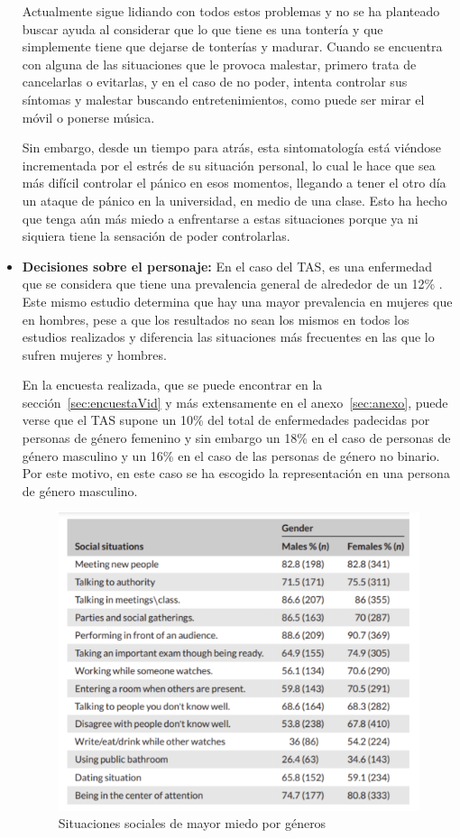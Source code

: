 \documentclass[12pt, a4paper,twoside,titlepage]{book}
\begin{document}
\begin{itemize}
{    Actualmente sigue lidiando con todos estos problemas y no se ha planteado buscar ayuda al considerar que lo que tiene es una tontería y que simplemente tiene que dejarse de tonterías y madurar. Cuando se encuentra con alguna de las situaciones que le provoca malestar, primero trata de cancelarlas o evitarlas, y en el caso de no poder, intenta controlar sus síntomas y malestar buscando entretenimientos, como puede ser mirar el móvil o ponerse música. 
    
    Sin embargo, desde un tiempo para atrás, esta sintomatología está viéndose incrementada por el estrés de su situación personal, lo cual le hace que sea más difícil controlar el pánico en esos momentos, llegando a tener el otro día un ataque de pánico en la universidad, en medio de una clase. Esto ha hecho que tenga aún más miedo a enfrentarse a estas situaciones porque ya ni siquiera tiene la sensación de poder controlarlas. 
    }
    
     \item \textbf{Decisiones sobre el personaje:}
     En el caso del TAS, es una enfermedad que se considera que tiene una prevalencia general de alrededor de un 12\% \cite{articuloTAS}. Este mismo estudio determina que hay una mayor prevalencia en mujeres que en hombres, pese a que los resultados no sean los mismos en todos los estudios realizados y diferencia las situaciones más frecuentes en las que lo sufren mujeres y hombres. 
     
     En la encuesta realizada, que se puede encontrar en la sección~\ref{sec:encuestaVid} y más extensamente en el anexo~\ref{sec:anexo}, puede verse que el TAS supone un 10\% del total de enfermedades padecidas por personas de género femenino y sin embargo un 18\% en el caso de personas de género masculino y un 16\% en el caso de las personas de género no binario. Por este motivo, en este caso se ha escogido la representación en una persona de género masculino. 
     
\begin{figure}
    \centering
    \includegraphics[width=.9\linewidth]{TGF/Extra/TAS.png}
    \caption{Situaciones sociales de mayor miedo por géneros}
    \label{fig:TAS}
\end{figure}
     

\end{itemize}
\end{document}
